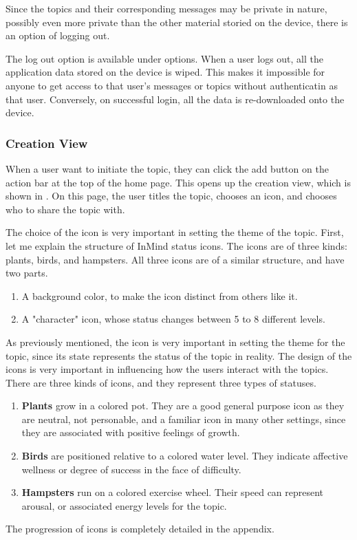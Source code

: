       Since the topics and their corresponding messages may be private in nature,
      possibly even more private than the other material storied on the device,
      there is an option of logging out.

      The log out option is available under options.
      When a user logs out, all the application data stored on the device is wiped.
      This makes it impossible for anyone to get access to that user's
      messages or topics without authenticatin as that user.
      Conversely, on successful login, all the data is re-downloaded onto the device.

      \subsubsection{Creation View}
      When a user want to initiate the topic,
      they can click the add button on the action bar at the top of the home page.
      This opens up the creation view, which is shown in \cite{}.
      On this page, the user titles the topic,
      chooses an icon, and chooses who to share the topic with.

      The choice of the icon is very important in setting the theme of the topic.
      First, let me explain the structure of InMind status icons.
      The icons are of three kinds: plants, birds, and hampsters.
      All three icons are of a similar structure, and have two parts.
      \begin{enumerate}
      \item A background color, to make the icon distinct from others like it.
      \item A "character" icon, whose status changes between 5 to 8 different levels.
      \end{enumerate}

      As previously mentioned, the icon is very important in setting
      the theme for the topic, since its state represents the status of the topic
      in reality.
      The design of the icons is very important in influencing how
      the users interact with the topics. 
      There are three kinds of icons, and they represent three types of statuses.
      \begin{enumerate}
      \item \textbf{Plants} grow in a colored pot. They are a good general purpose icon as they are neutral,
      not personable, and a familiar icon in many other settings,
      since they are associated with positive feelings of growth.
      \item \textbf{Birds} are positioned relative to a colored water level.
      They indicate affective wellness or degree of success in the face of difficulty.
      \item \textbf{Hampsters} run on a colored exercise wheel.
      Their speed can represent arousal,
      or associated energy levels for the topic.
      \end{enumerate}
      The progression of icons is completely detailed in the appendix.

